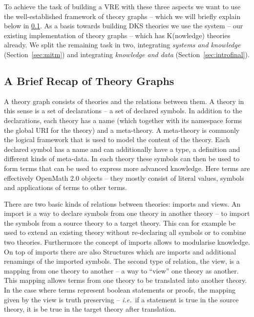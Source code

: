 \documentclass{deliverablereport}
\begin{document}
To achieve the task of building a VRE with these three aspects we want to use the well-established framework of theory graphs -- which we will briefly explain below in \ref{sec:MMT}. As a basis towards building DKS theories we use the \MMT system -- our existing implementation of theory graphs -- which has K(nowledge) theories already. We split the remaining task in two, integrating \textit{systems and knowledge} (Section~\ref{sec:mitm}) and integrating \textit{knowledge and data} (Section~\ref{sec:introfinal}).

\subsection{A Brief Recap of Theory Graphs}\label{sec:MMT}

A theory graph consists of theories and the relations between them. A theory in this sense is a set of declarations -- a set of declared symbols. In addition to the declarations, each theory has a name (which together with its namespace forms the global URI for the theory) and a meta-theory. A meta-theory is commonly the logical framework that is used to model the content of the theory. Each declared symbol has a name and can additionally have a type, a definition and different kinds of meta-data. In each theory these symbols can then be used to form terms that can be used to express more advanced knowledge. Here terms are effectively OpenMath 2.0 \cite{BusCapCar:2oms04} objects -- they mostly consist of literal values, symbols and applications of terms to other terms.

There are two basic kinds of relations between theories: imports and views. An import is a way to declare symbols from one theory in another theory -- to import the symbols from a source theory to a target theory. This can for example be used to extend an existing theory without re-declaring all symbols or to combine two theories. Furthermore the concept of imports allows to modularise knowledge. On top of imports there are also Structures which are imports and additional renamings of the imported symbols. The second type of relation, the view, is a mapping from one theory to another -- a way to ``view'' one theory as another. This mapping allows terms from one theory to be translated into another theory. In the case where terms represent boolean statements or proofs, the mapping given by the view is truth preserving -- \emph{i.e.}~if a statement is true in the source theory, it is be true in the target theory after translation.
\end{document}
